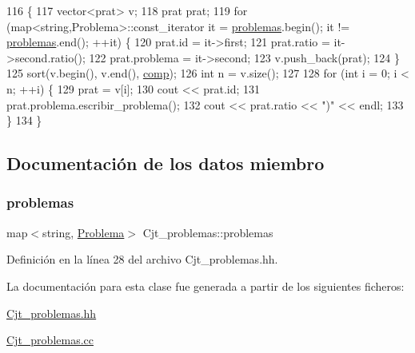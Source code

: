 \begin{DoxyCode}
116                                                \{
117       vector<prat> v;
118       prat prat;
119       \textcolor{keywordflow}{for} (map<string,Problema>::const\_iterator it = \mbox{\hyperlink{class_cjt__problemas_aad49222fb63517d7d7fc3d691f045cc5}{problemas}}.begin(); it != 
      \mbox{\hyperlink{class_cjt__problemas_aad49222fb63517d7d7fc3d691f045cc5}{problemas}}.end(); ++it) \{
120         prat.id = it->first;
121         prat.ratio = it->second.ratio();
122         prat.problema = it->second;
123         v.push\_back(prat);
124       \}
125       sort(v.begin(), v.end(), \mbox{\hyperlink{class_cjt__problemas_ae5b468db02077990aedcd73835aaa9e1}{comp}});
126       \textcolor{keywordtype}{int} n = v.size();
127 
128       \textcolor{keywordflow}{for} (\textcolor{keywordtype}{int} i = 0; i < n; ++i) \{
129         prat = v[i];
130         cout << prat.id;
131         prat.problema.escribir\_problema();
132         cout << prat.ratio << \textcolor{stringliteral}{")"} << endl;
133       \}
134     \}
\end{DoxyCode}


\subsection{Documentación de los datos miembro}
\mbox{\label{class_cjt__problemas_aad49222fb63517d7d7fc3d691f045cc5}} 
\subsubsection{\texorpdfstring{problemas}{problemas}}
{\footnotesize\ttfamily map$<$string, \mbox{\hyperlink{class_problema}{Problema}}$>$ Cjt\+\_\+problemas\+::problemas\hspace{0.3cm}{\ttfamily [private]}}



Definición en la línea 28 del archivo Cjt\+\_\+problemas.\+hh.



La documentación para esta clase fue generada a partir de los siguientes ficheros\+:\begin{DoxyCompactItemize}
\item 
\mbox{\hyperlink{_cjt__problemas_8hh}{Cjt\+\_\+problemas.\+hh}}\item 
\mbox{\hyperlink{_cjt__problemas_8cc}{Cjt\+\_\+problemas.\+cc}}\end{DoxyCompactItemize}
